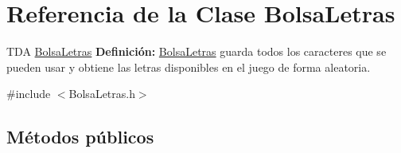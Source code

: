 \hypertarget{class_bolsa_letras}{}\section{Referencia de la Clase Bolsa\+Letras}
\label{class_bolsa_letras}


T\+DA \hyperlink{class_bolsa_letras}{Bolsa\+Letras} {\bfseries Definición\+:} \hyperlink{class_bolsa_letras}{Bolsa\+Letras} guarda todos los caracteres que se pueden usar y obtiene las letras disponibles en el juego de forma aleatoria.  




{\ttfamily \#include $<$Bolsa\+Letras.\+h$>$}

\subsection*{Métodos públicos}
